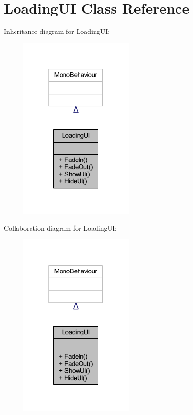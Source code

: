 \hypertarget{class_loading_u_i}{}\section{Loading\+UI Class Reference}
\label{class_loading_u_i}


Inheritance diagram for Loading\+UI\+:
\nopagebreak
\begin{figure}[H]
\begin{center}
\leavevmode
\includegraphics[width=163pt]{class_loading_u_i__inherit__graph}
\end{center}
\end{figure}


Collaboration diagram for Loading\+UI\+:
\nopagebreak
\begin{figure}[H]
\begin{center}
\leavevmode
\includegraphics[width=163pt]{class_loading_u_i__coll__graph}
\end{center}
\end{figure}
